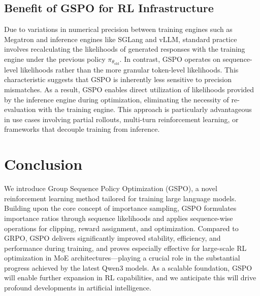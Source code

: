 \subsection{Benefit of GSPO for RL Infrastructure}

Due to variations in numerical precision between training engines such as Megatron and inference engines like SGLang and vLLM, standard practice involves recalculating the likelihoods of generated responses with the training engine under the previous policy $\pi_{\theta_\text{old}}$. In contrast, GSPO operates on sequence-level likelihoods rather than the more granular token-level likelihoods. This characteristic suggests that GSPO is inherently less sensitive to precision mismatches. As a result, GSPO enables direct utilization of likelihoods provided by the inference engine during optimization, eliminating the necessity of re-evaluation with the training engine. This approach is particularly advantageous in use cases involving partial rollouts, multi-turn reinforcement learning, or frameworks that decouple training from inference.

\section{Conclusion}

We introduce Group Sequence Policy Optimization (GSPO), a novel reinforcement learning method tailored for training large language models. Building upon the core concept of importance sampling, GSPO formulates importance ratios through sequence likelihoods and applies sequence-wise operations for clipping, reward assignment, and optimization. Compared to GRPO, GSPO delivers significantly improved stability, efficiency, and performance during training, and proves especially effective for large-scale RL optimization in MoE architectures—playing a crucial role in the substantial progress achieved by the latest Qwen3 models. As a scalable foundation, GSPO will enable further expansion in RL capabilities, and we anticipate this will drive profound developments in artificial intelligence.

